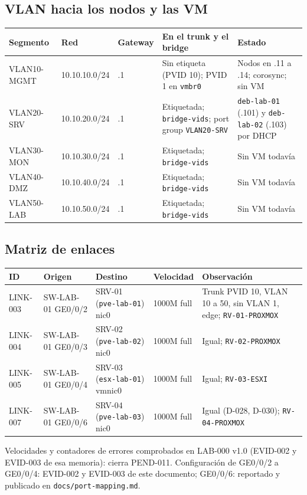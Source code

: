 \documentclass[11pt,a4paper]{article}
\newcommand{\cab}{\rowcolor{light}}
\newcommand{\fn}[1]{\texttt{\fnbreaks#1\fnend}}
\def\fnbreaks#1\fnend{\begingroup\fnactive\scantokens{#1\noexpand}\endgroup}
\gdef\fnactive{\catcode`\-=\active\catcode`\/=\active
  \def-{\char`\-\allowbreak}\def/{\char`\/\allowbreak}\let\_\fnus}
\newcommand{\fnus}{\textunderscore\allowbreak}
\begin{document}
\subsection{VLAN hacia los nodos y las VM}
{\small
\begin{longtable}{L{2.6cm} L{2.6cm} L{1.8cm} L{3.2cm} L{4.0cm}}
  \toprule
  \cab\textbf{Segmento} & \textbf{Red} & \textbf{Gateway} & \textbf{En el trunk y el bridge} & \textbf{Estado}\\
  \midrule
  \endhead
  VLAN10-MGMT & 10.10.10.0/24 & .1 & Sin etiqueta (PVID 10); PVID 1 en \texttt{vmbr0} & Nodos en .11 a .14; corosync; sin VM\\
  VLAN20-SRV & 10.10.20.0/24 & .1 & Etiquetada; \texttt{bridge-vids}; port group \texttt{VLAN20-SRV} & \texttt{deb-lab-01} (.101) y \texttt{deb-lab-02} (.103) por DHCP\\
  VLAN30-MON & 10.10.30.0/24 & .1 & Etiquetada; \texttt{bridge-vids} & Sin VM todavía\\
  VLAN40-DMZ & 10.10.40.0/24 & .1 & Etiquetada; \texttt{bridge-vids} & Sin VM todavía\\
  VLAN50-LAB & 10.10.50.0/24 & .1 & Etiquetada; \texttt{bridge-vids} & Sin VM todavía\\
  \bottomrule
\end{longtable}
}

\subsection{Matriz de enlaces}
{\small
\begin{longtable}{L{1.6cm} L{2.6cm} L{3.0cm} L{2.0cm} L{5.0cm}}
  \toprule
  \cab\textbf{ID} & \textbf{Origen} & \textbf{Destino} & \textbf{Velocidad} & \textbf{Observación}\\
  \midrule
  \endhead
  LINK-003 & SW-LAB-01 GE0/0/2 & SRV-01 (\texttt{pve-lab-01}) nic0 & 1000M full & Trunk PVID 10, VLAN 10 a 50, sin VLAN 1, edge; \fn{SRV-01-PROXMOX}\\
  LINK-004 & SW-LAB-01 GE0/0/3 & SRV-02 (\texttt{pve-lab-02}) nic0 & 1000M full & Igual; \fn{SRV-02-PROXMOX}\\
  LINK-005 & SW-LAB-01 GE0/0/4 & SRV-03 (\texttt{esx-lab-01}) vmnic0 & 1000M full & Igual; \fn{SRV-03-ESXI}\\
  LINK-007 & SW-LAB-01 GE0/0/6 & SRV-04 (\texttt{pve-lab-03}) nic0 & 1000M full & Igual (D-028, D-030); \fn{SRV-04-PROXMOX}\\
  \bottomrule
\end{longtable}
}
Velocidades y contadores de errores comprobados en LAB-000 v1.0 (EVID-002 y EVID-003 de esa memoria): cierra PEND-011. Configuración de GE0/0/2 a GE0/0/4: EVID-002 y EVID-003 de este documento; GE0/0/6: reportado y publicado en \texttt{docs/port-mapping.md}.
\end{document}
